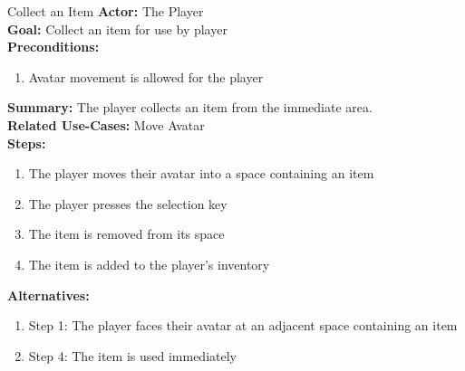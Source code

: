 \documentclass[12pt]{report}
\begin{document}
\begin{subsection}{Collect an Item}
\textbf{Actor:} The Player \\
\textbf{Goal:} Collect an item for use by player \\
\textbf{Preconditions:} \begin{enumerate}
	\item Avatar movement is allowed for the player
\end{enumerate}
\textbf{Summary:} The player collects an item from the immediate area. \\
\textbf{Related Use-Cases:} Move Avatar \\
\textbf{Steps:}
\begin{enumerate}
	\item The player moves their avatar into a space containing an item
	\item The player presses the selection key
	\item The item is removed from its space
	\item The item is added to the player's inventory
\end{enumerate}
\textbf{Alternatives:} 
\begin{enumerate}
	\item Step 1: The player faces their avatar at an adjacent space containing an item
	\item Step 4: The item is used immediately
\end{enumerate}
\end{subsection}
\end{document}
